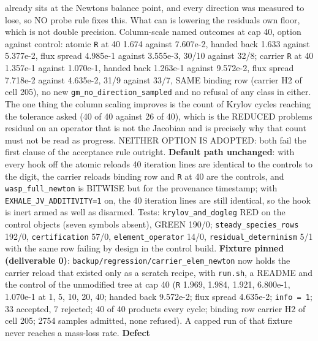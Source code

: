 \documentclass[english,a4paper]{my_memo}
\begin{document}
\begin{itemize}
  already sits at the Newton\textquotesingle s balance point, and every direction was
  measured to lose, so NO probe rule fixes this. What can is lowering the
  residual\textquotesingle s own floor, which is not double precision.
  Column-scale named outcomes at cap 40, option against control:
  atomic \texttt{\textbar{}\textbar{}R\textbar{}\textbar{}} at 40 1.674 against 7.607e-2, handed back 1.633 against
  5.377e-2, flux spread 4.985e-1 against 3.555e-3, 30/10 against 32/8;
  carrier \texttt{\textbar{}\textbar{}R\textbar{}\textbar{}} at 40 1.357e-1 against 1.070e-1, handed back 1.263e-1
  against 9.572e-2, flux spread 7.718e-2 against 4.635e-2, 31/9 against
  33/7, SAME binding row (carrier H2 of cell 205), no new
  \texttt{gm\_no\_direction\_sampled} and no refusal of any class in either. The one
  thing the column scaling improves is the count of Krylov cycles reaching the
  tolerance asked (40 of 40 against 26 of 40), which is the REDUCED
  problem\textquotesingle s residual on an operator that is not the Jacobian and is
  precisely why that count must not be read as progress. NEITHER OPTION IS
  ADOPTED: both fail the first clause of the acceptance rule outright.
  \textbf{Default path unchanged}: with every hook off the atomic reload\textquotesingle s 40
  iteration lines are identical to the control\textquotesingle s to the digit, the carrier
  reload\textquotesingle s binding row and \texttt{\textbar{}\textbar{}R\textbar{}\textbar{}} at 40 are the control\textquotesingle s, and
  \texttt{wasp\_full\_newton} is BITWISE but for the provenance timestamp; with
  \texttt{EXHALE\_JV\_ADDITIVITY=1} on, the 40 iteration lines are still identical,
  so the hook is inert armed as well as disarmed. Tests: \texttt{krylov\_and\_dogleg}
  RED on the control objects (seven symbols absent), GREEN 190/0;
  \texttt{steady\_species\_rows} 192/0, \texttt{certification} 57/0, \texttt{element\_operator}
  14/0, \texttt{residual\_determinism} 5/1 with the same row failing by design in
  the control build. \textbf{Fixture pinned (deliverable 0)}:
  \texttt{backup/regression/carrier\_elem\_newton} now holds the carrier reload that
  existed only as a scratch recipe, with \texttt{run.sh}, a README and the control
  of the unmodified tree at cap 40 (\texttt{\textbar{}\textbar{}R\textbar{}\textbar{}} 1.969, 1.984, 1.921, 6.800e-1,
  1.070e-1 at 1, 5, 10, 20, 40; handed back 9.572e-2; flux spread 4.635e-2;
  \texttt{info\ =\ 1}; 33 accepted, 7 rejected; 40 of 40 products every cycle;
  binding row carrier H2 of cell 205; 2754 samples admitted, none refused).
  A capped run of that fixture never reaches a mass-loss rate. \textbf{Defect
}
\end{itemize}
\end{document}
